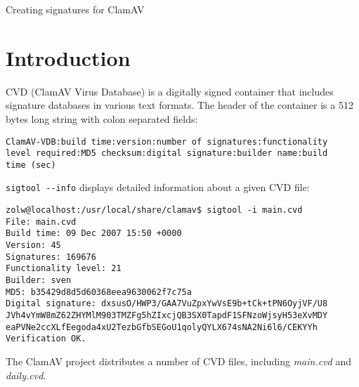 \documentclass[a4paper,titlepage,12pt]{article}
\date{}
\begin{document}
    \begin{center}
	\huge Creating signatures for ClamAV\\
	\vspace{2cm}
    \end{center}

    \noindent
    \section{Introduction}
    CVD (ClamAV Virus Database) is a digitally signed container that
    includes signature databases in various text formats. The header
    of the container is a 512 bytes long string with colon separated fields:
    \begin{verbatim}
ClamAV-VDB:build time:version:number of signatures:functionality
level required:MD5 checksum:digital signature:builder name:build
time (sec)
    \end{verbatim}
    \verb+sigtool --info+ displays detailed information about a given CVD file:
    \begin{verbatim}
zolw@localhost:/usr/local/share/clamav$ sigtool -i main.cvd
File: main.cvd
Build time: 09 Dec 2007 15:50 +0000
Version: 45
Signatures: 169676
Functionality level: 21
Builder: sven
MD5: b35429d8d5d60368eea9630062f7c75a
Digital signature: dxsusO/HWP3/GAA7VuZpxYwVsE9b+tCk+tPN6OyjVF/U8
JVh4vYmW8mZ62ZHYMlM903TMZFg5hZIxcjQB3SX0TapdF1SFNzoWjsyH53eXvMDY
eaPVNe2ccXLfEegoda4xU2TezbGfbSEGoU1qolyQYLX674sNA2Ni6l6/CEKYYh
Verification OK.
    \end{verbatim}
    The ClamAV project distributes a number of CVD files, including
    \emph{main.cvd} and \emph{daily.cvd}.
\end{document}
